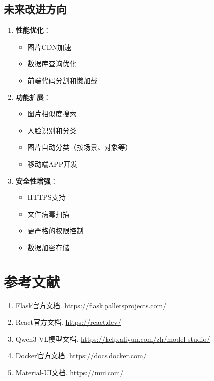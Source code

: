 \documentclass[12pt,a4paper]{article}
\begin{document}
\subsection{未来改进方向}

\begin{enumerate}
    \item \textbf{性能优化}：
    \begin{itemize}
        \item 图片CDN加速
        \item 数据库查询优化
        \item 前端代码分割和懒加载
    \end{itemize}
    
    \item \textbf{功能扩展}：
    \begin{itemize}
        \item 图片相似度搜索
        \item 人脸识别和分类
        \item 图片自动分类（按场景、对象等）
        \item 移动端APP开发
    \end{itemize}
    
    \item \textbf{安全性增强}：
    \begin{itemize}
        \item HTTPS支持
        \item 文件病毒扫描
        \item 更严格的权限控制
        \item 数据加密存储
    \end{itemize}
\end{enumerate}

\section{参考文献}

\begin{enumerate}
    \item Flask官方文档. \url{https://flask.palletsprojects.com/}
    \item React官方文档. \url{https://react.dev/}
    \item Qwen3 VL模型文档. \url{https://help.aliyun.com/zh/model-studio/}
    \item Docker官方文档. \url{https://docs.docker.com/}
    \item Material-UI文档. \url{https://mui.com/}
\end{enumerate}
\end{document}
